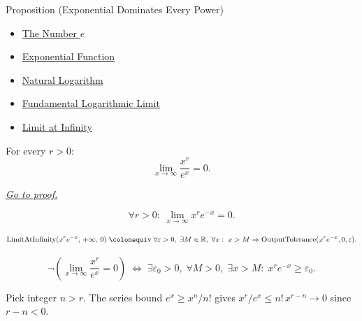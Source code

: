 
\begin{propositionbox}{Proposition (Exponential Dominates Every Power)}

\begin{dependencies}
\begin{itemize}
  \item \hyperref[def:number-e]{The Number $e$}
  \item \hyperref[def:exponential]{Exponential Function}
  \item \hyperref[def:natural-logarithm]{Natural Logarithm}
  \item \hyperref[prop:limit-logarithm-fundamental]{Fundamental Logarithmic Limit}
  \item \hyperref[def:limit-at-infinity]{Limit at Infinity}
\end{itemize}
\end{dependencies}
\begin{proposition}
\label{prop:exponential-dominates-power}
For every $r > 0$:
\[
  \lim_{x \to \infty} \frac{x^r}{e^x} = 0.
\]

\smallskip\noindent
\hyperref[prf:exponential-dominates-power]{\textit{Go to proof.}}
\end{proposition}
\end{propositionbox}\begin{remark*}
\[
  \forall r > 0 :\; \lim_{x \to \infty} x^r e^{-x} = 0.
\]
\end{remark*}

\begin{remark*}
\[
  \operatorname{LimitAtInfinity}(x^r e^{-x},\,+\infty,\,0)
  \;\colonequiv\;
  \forall\varepsilon>0,\;\exists M\in\mathbb{R},\;\forall x:\;
  x>M \Rightarrow \operatorname{OutputTolerance}(x^r e^{-x},0,\varepsilon).
\]
\end{remark*}

\begin{remark*}
\[
  \neg\left(\lim_{x\to\infty}\frac{x^r}{e^x}=0\right)
  \;\iff\;
  \exists\varepsilon_0>0,\;\forall M>0,\;\exists x>M:\;
  x^r e^{-x} \geq \varepsilon_0.
\]
\end{remark*}

\begin{remark*}
Pick integer $n > r$. The series bound $e^x \geq x^n/n!$ gives
$x^r/e^x \leq n!\, x^{r-n} \to 0$ since $r - n < 0$.
\end{remark*}

